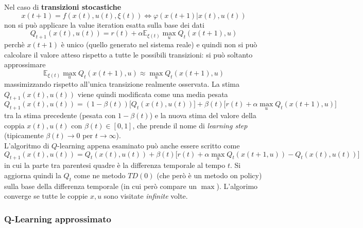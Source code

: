 Nel caso di \textbf{transizioni stocastiche}
\begin{equation}
x(t+1) = f(x(t), u(t), \xi(t)) \iff \varphi(x(t+1)|x(t), u(t))
\end{equation} non si pu\`o applicare la value iteration esatta sulla base dei dati
\begin{equation}
Q_{t+1} (x(t), u(t)) = r(t) + \alpha \mathbb{E}_{\xi(t)} \max_u Q_t(x(t+1), u)
\end{equation} perch\`e $x(t+1)$ \`e unico (quello generato nel sistema reale) e quindi non si pu\`o calcolare il valore atteso rispetto a tutte le possibili transizioni: si pu\`o soltanto approssimare
\begin{equation}
\mathbb{E}_{\xi(t)} \max_u Q_t (x(t+1), u) \approx \max_u Q_t (x(t+1), u)
\end{equation} massimizzando rispetto all'unica transizione realmente osservata. 
La stima $Q_{t+1}(x(t),u(t))$ viene quindi modificata come una media pesata
\begin{equation}
\label{eqn:qlear}
Q_{t+1}(x(t),u(t)) = (1 - \beta(t)) \Big [ Q_t(x(t), u(t)) \Big ] + \beta(t) \Big [ r(t) + \alpha \max_u Q_t (x(t+1), u) \Big ]
\end{equation} tra la stima precedente (pesata con $1-\beta(t)$) e la nuova stima del valore della coppia $x(t), u(t)$ con $\beta(t) \in [0,1]$, che prende il nome di \textit{learning step} (tipicamente $\beta(t) \to 0$ per $t \to \infty$).\\
L'algoritmo di $Q$-learning appena esaminato pu\`o anche essere scritto come
\begin{equation}
Q_{t+1}(x(t),u(t)) = Q_t(x(t),u(t)) + \beta(t) \Big [ r(t) + \alpha \max_u Q_t(x(t+1,u)) - Q_t(x(t),u(t)) \Big ]
\end{equation} in cui la parte tra parentesi quadre \`e la differenza temporale al tempo $t$. Si aggiorna quindi la $Q_t$ come ne metodo $TD(0)$ (che per\`o \`e un metodo on policy) sulla base della differenza temporale (in cui per\`o compare un $\max$).
L'algorimo converge se tutte le coppie $x,u$ sono visitate \textit{infinite} volte.

\subsubsection{Q-Learning approssimato}

